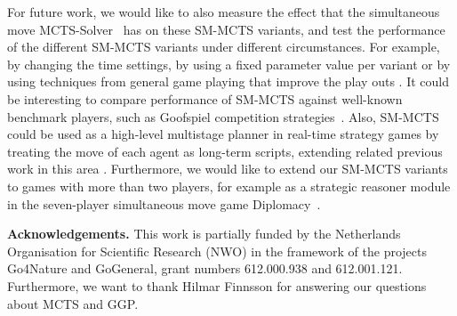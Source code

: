 \documentclass[conference]{IEEEtran}
\begin{document}
For future work, we would like to also measure the effect that the simultaneous move MCTS-Solver~\cite[Chapter 6]{Finnsson12} has on these 
SM-MCTS variants, and test the performance of the different SM-MCTS variants under different circumstances. For example, by changing the time settings, 
by using a fixed parameter value per variant or by using techniques from general game playing that improve the play outs \cite{Bjornsson09CadiaPlayer}.
It could be interesting to compare performance of SM-MCTS against well-known benchmark players, such as Goofspiel competition 
strategies~\cite{Dror13Repeated}.
Also, SM-MCTS could be used as a high-level multistage planner in real-time strategy games by treating the move of each agent
as long-term scripts, extending related previous work in this area \cite{Sailor07adversarial}. 
Furthermore, we would like to extend our SM-MCTS variants to games with more than two players, for example as a strategic reasoner 
module in the seven-player simultaneous move game Diplomacy~\cite{Fabregues11DipGame}.

{\bf Acknowledgements.} {\small This work is partially funded by the Netherlands Organisation for
Scientific Research (NWO) in the framework of the projects Go4Nature and GoGeneral, grant numbers 
612.000.938 and 612.001.121. Furthermore, we want to thank Hilmar Finnsson for answering our questions about MCTS and GGP.}

%
%
\end{document}

